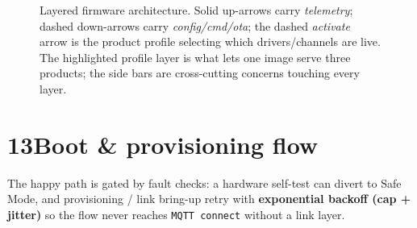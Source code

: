 \begin{figure}[H]
{}
\caption{Layered firmware architecture. Solid up-arrows carry \emph{telemetry}; dashed down-arrows
carry \emph{config/cmd/ota}; the dashed \emph{activate} arrow is the product profile selecting which
drivers/channels are live. The highlighted profile layer is what lets one image serve three products;
the side bars are cross-cutting concerns touching every layer.}
\end{figure}

\section*{13\quad Boot \& provisioning flow}
The happy path is gated by fault checks: a hardware self-test can divert to Safe Mode, and
provisioning / link bring-up retry with \textbf{exponential backoff (cap + jitter)} so the flow
never reaches \texttt{MQTT connect} without a link layer.

